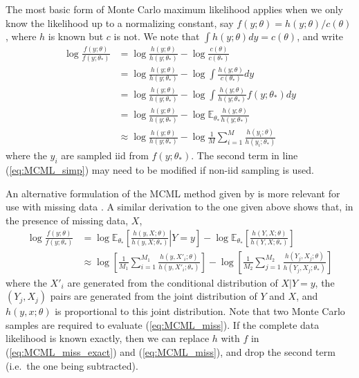 \documentclass[ss]{imsart}
\theoremstyle{plain}
\theoremstyle{definition}
\theoremstyle{remark}
\newcommand{\bE}{\mathbb{E}}
\begin{document}
The most basic form of Monte Carlo maximum likelihood \citep{Gey91} applies when we only know the likelihood up to a normalizing constant, say $f(y; \theta) = h(y; \theta) / c(\theta)$, where $h$ is known but $c$ is not. We note that $\int h(y; \theta) dy = c(\theta)$, and write
%
\begin{align}
    \log \frac{f(y; \theta)}{f(y; \theta_*)} &= \log \frac{h(y; \theta)}{h(y; \theta_*)} - \log \frac{c(\theta)}{c(\theta_*)}\\
    &= \log \frac{h(y; \theta)}{h(y; \theta_*)} - \log \int \frac{h(y; \theta)}{c(\theta_*)} dy\\
    &= \log \frac{h(y; \theta)}{h(y; \theta_*)} - \log \int \frac{h(y; \theta)}{h(y; \theta_*)} f(y; \theta_*) dy\\
    &= \log \frac{h(y; \theta)}{h(y; \theta_*)} - \log \bE_{\theta_*} \frac{h(y; \theta)}{h(y; \theta_*)}\\
    & \approx \log \frac{h(y; \theta)}{h(y; \theta_*)} - \log \frac{1}{M} \sum_{i=1}^M \frac{h(y_i; \theta)}{h(y_i; \theta_*)} \label{eq:MCML_simp}
\end{align}
%
where the $y_i$ are sampled iid from $f(y; \theta_*)$. The second term in line (\ref{eq:MCML_simp}) may need to be modified if non-iid sampling is used.

An alternative formulation of the MCML method given by \citet{Gel93} is more relevant for use with missing data \citep[see also][]{Gey94}. A similar derivation to the one given above shows that, in the presence of missing data, $X$,
%
\begin{align}
    \log \frac{f(y; \theta)}{f(y; \theta_*)} &= \log \bE_{\theta_*} \left[ \left. \frac{h(y, X; \theta)}{h(y, X; \theta_*)} \right| Y=y \right] - \log \bE_{\theta_*} \left[\frac{h(Y, X; \theta)}{h(Y, X; \theta_*)}\right] \label{eq:MCML_miss_exact}\\
    & \approx \log \left[\frac{1}{M_1} \sum_{i=1}^{M_1} \frac{h(y, X'_i; \theta)}{h(y, X'_i; \theta_*)}\right] - \log \left[\frac{1}{M_2} \sum_{j = 1}^{M_2} \frac{h(Y_j, X_j; \theta)}{h(Y_j, X_j; \theta_*)}\right] \label{eq:MCML_miss}
\end{align}
%
where the $X'_i$ are generated from the conditional distribution of $X|Y=y$, the $(Y_j, X_j)$ pairs are generated from the joint distribution of $Y$ and $X$, and $h(y, x; \theta)$ is proportional to this joint distribution. Note that two Monte Carlo samples are required to evaluate (\ref{eq:MCML_miss}). If the complete data likelihood is known exactly, then we can replace $h$ with $f$ in (\ref{eq:MCML_miss_exact}) and (\ref{eq:MCML_miss}), and drop the second term (i.e.\ the one being subtracted).
\end{document}
